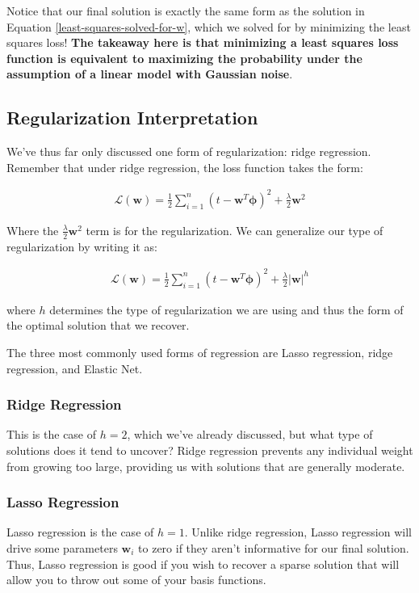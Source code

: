 Notice that our final solution is exactly the same form as the solution in Equation \ref{least-squares-solved-for-w}, which we solved for by minimizing the least squares loss! \textbf{The takeaway here is that minimizing a least squares loss function is equivalent to maximizing the probability under the assumption of a linear model with Gaussian noise}.

\subsection{Regularization Interpretation}
We've thus far only discussed one form of regularization: ridge regression. Remember that under ridge regression, the loss function takes the form:

\begin{align*}
    \mathcal{L}(\textbf{w}) = \frac{1}{2} \sum_{i=1}^{n} (t - \textbf{w}^{T}\boldsymbol{\phi})^2 + \frac{\lambda}{2}\textbf{w}^{2}
\end{align*}

Where the $\frac{\lambda}{2}\textbf{w}^{2}$ term is for the regularization. We can generalize our type of regularization by writing it as:

\begin{align*}
    \mathcal{L}(\textbf{w}) = \frac{1}{2} \sum_{i=1}^{n} (t - \textbf{w}^{T}\boldsymbol{\phi})^2 + \frac{\lambda}{2}\big|\textbf{w}\big|^{h}
\end{align*}

where $h$ determines the type of regularization we are using and thus the form of the optimal solution that we recover.

The three most commonly used forms of regression are Lasso regression, ridge regression, and Elastic Net.

\subsubsection{Ridge Regression}
This is the case of $h = 2$, which we've already discussed, but what type of solutions does it tend to uncover? Ridge regression prevents any individual weight from growing too large, providing us with solutions that are generally moderate.

\subsubsection{Lasso Regression}
Lasso regression is the case of $h = 1$. Unlike ridge regression, Lasso regression will drive some parameters $\textbf{w}_{i}$ to zero if they aren't informative for our final solution. Thus, Lasso regression is good if you wish to recover a sparse solution that will allow you to throw out some of your basis functions.

